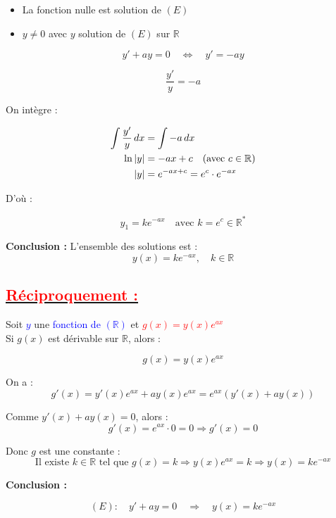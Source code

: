 \documentclass[12pt]{article}
\begin{document}
\begin{itemize}
    \item La fonction nulle est solution de \((E)\)
    \item \( y \neq 0 \) avec \( y \) solution de \((E)\) sur \(\mathbb{R}\)
\end{itemize}

\[
y' + ay = 0 \quad \Leftrightarrow \quad y' = -ay
\]

\[
\frac{y'}{y} = -a
\]

\vspace{0.3cm}

On intègre :

\begin{align*}
\int \frac{y'}{y} \, dx &= \int -a \, dx \\
\ln |y| &= -ax + c \quad \text{(avec \( c \in \mathbb{R} \))} \\
|y| &= e^{-ax + c} = e^{c} \cdot e^{-ax}
\end{align*}

D’où :

\[
y_1 = ke^{-ax} \quad \text{avec } k = e^c \in \mathbb{R}^{*}
\]

\textbf{Conclusion :} L'ensemble des solutions est :
\[
\boxed{y(x) = ke^{-ax},\quad k \in \mathbb{R}}
\]

\subsection*{\underline{\textcolor{red}{Réciproquement :}}}

Soit \textcolor{blue}{\( y \)} une \textcolor{blue}{fonction de \((\mathbb{R})\)} et \textcolor{red}{\( g(x) = y(x)e^{ax} \)} \\
Si \( g(x) \) est dérivable sur \( \mathbb{R} \), alors :

\[
g(x) = y(x) e^{ax}
\]

On a :
\[
g'(x) = y'(x)e^{ax} + ay(x)e^{ax} = e^{ax} \left( y'(x) + ay(x) \right)
\]

Comme \( y'(x) + ay(x) = 0 \), alors :
\[
g'(x) = e^{ax} \cdot 0 = 0
\Rightarrow g'(x) = 0
\]

Donc \( g \) est une constante :
\[
\text{Il existe } k \in \mathbb{R} \text{ tel que } g(x) = k
\Rightarrow y(x)e^{ax} = k \Rightarrow y(x) = ke^{-ax}
\]

\vspace{0.5cm}

\textbf{Conclusion :}

\begin{tcolorbox}[colback=white, colframe=red, sharp corners=southwest, boxrule=1pt]
\[
\boxed{(E):\quad y' + ay = 0 \quad \Rightarrow \quad y(x) = ke^{-ax}}
\]
\end{tcolorbox}
\end{document}
